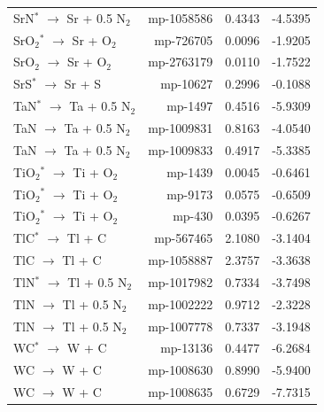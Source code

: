 \begin{longtable}{@{}lrrr@{}}
SrN$^*$ $\rightarrow$ Sr + 0.5 N$_{2}$ & mp-1058586 & 0.4343 & -4.5395 \\
SrO$_{2}$$^*$ $\rightarrow$ Sr + O$_{2}$ & mp-726705 & 0.0096 & -1.9205 \\
SrO$_{2}$ $\rightarrow$ Sr + O$_{2}$ & mp-2763179 & 0.0110 & -1.7522 \\
SrS$^*$ $\rightarrow$ Sr + S & mp-10627 & 0.2996 & -0.1088 \\
TaN$^*$ $\rightarrow$ Ta + 0.5 N$_{2}$ & mp-1497 & 0.4516 & -5.9309 \\
TaN $\rightarrow$ Ta + 0.5 N$_{2}$ & mp-1009831 & 0.8163 & -4.0540 \\
TaN $\rightarrow$ Ta + 0.5 N$_{2}$ & mp-1009833 & 0.4917 & -5.3385 \\
TiO$_{2}$$^*$ $\rightarrow$ Ti + O$_{2}$ & mp-1439 & 0.0045 & -0.6461 \\
TiO$_{2}$$^*$ $\rightarrow$ Ti + O$_{2}$ & mp-9173 & 0.0575 & -0.6509 \\
TiO$_{2}$$^*$ $\rightarrow$ Ti + O$_{2}$ & mp-430 & 0.0395 & -0.6267 \\
TlC$^*$ $\rightarrow$ Tl + C & mp-567465 & 2.1080 & -3.1404 \\
TlC $\rightarrow$ Tl + C & mp-1058887 & 2.3757 & -3.3638 \\
TlN$^*$ $\rightarrow$ Tl + 0.5 N$_{2}$ & mp-1017982 & 0.7334 & -3.7498 \\
TlN $\rightarrow$ Tl + 0.5 N$_{2}$ & mp-1002222 & 0.9712 & -2.3228 \\
TlN $\rightarrow$ Tl + 0.5 N$_{2}$ & mp-1007778 & 0.7337 & -3.1948 \\
WC$^*$ $\rightarrow$ W + C & mp-13136 & 0.4477 & -6.2684 \\
WC $\rightarrow$ W + C & mp-1008630 & 0.8990 & -5.9400 \\
WC $\rightarrow$ W + C & mp-1008635 & 0.6729 & -7.7315 \\
\end{longtable}
